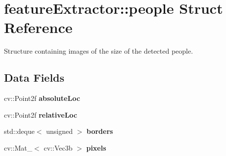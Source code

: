 \hypertarget{structfeatureExtractor_1_1people}{
\section{featureExtractor::people Struct Reference}
\label{structfeatureExtractor_1_1people}
}


Structure containing images of the size of the detected people.  


\subsection*{Data Fields}
\begin{DoxyCompactItemize}
\item 
\hypertarget{structfeatureExtractor_1_1people_a4c4cd2a66e931fe64dac2db0ae560caf}{
cv::Point2f {\bfseries absoluteLoc}}
\label{structfeatureExtractor_1_1people_a4c4cd2a66e931fe64dac2db0ae560caf}

\item 
\hypertarget{structfeatureExtractor_1_1people_a7d586e744f28a03d348fbf9336576895}{
cv::Point2f {\bfseries relativeLoc}}
\label{structfeatureExtractor_1_1people_a7d586e744f28a03d348fbf9336576895}

\item 
\hypertarget{structfeatureExtractor_1_1people_a281a0fcf51325f69c9c786a860e6074a}{
std::deque$<$ unsigned $>$ {\bfseries borders}}
\label{structfeatureExtractor_1_1people_a281a0fcf51325f69c9c786a860e6074a}

\item 
\hypertarget{structfeatureExtractor_1_1people_ad5fb2ece8816154ed45459c16e111263}{
cv::Mat\_\-$<$ cv::Vec3b $>$ {\bfseries pixels}}
\label{structfeatureExtractor_1_1people_ad5fb2ece8816154ed45459c16e111263}

\end{DoxyCompactItemize}

